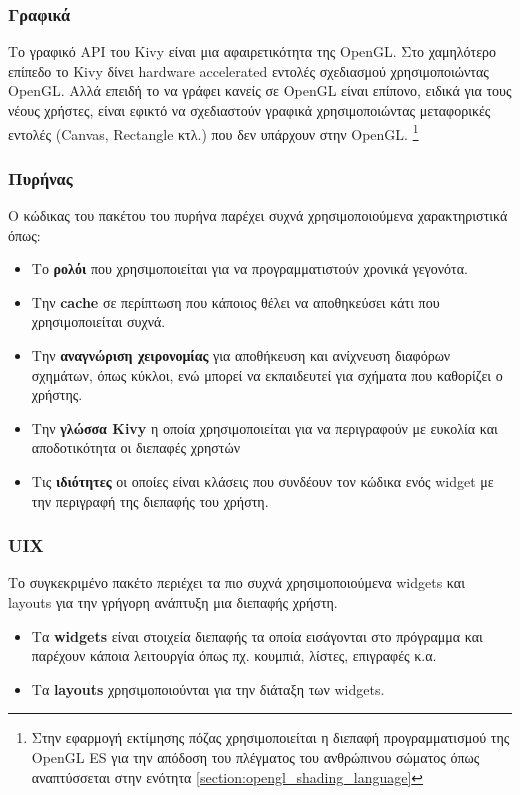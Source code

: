 \subsubsection{Γραφικά}
Το γραφικό API του Kivy είναι μια αφαιρετικότητα της OpenGL. Στο χαμηλότερο επίπεδο το Kivy δίνει hardware accelerated εντολές σχεδιασμού χρησιμοποιώντας OpenGL. Αλλά επειδή το να γράφει κανείς σε OpenGL είναι επίπονο, ειδικά για τους νέους χρήστες, είναι εφικτό να σχεδιαστούν γραφικά χρησιμοποιώντας μεταφορικές εντολές (Canvas, Rectangle κτλ.) που δεν υπάρχουν στην OpenGL. \footnote{Στην εφαρμογή εκτίμησης πόζας χρησιμοποιείται η διεπαφή προγραμματισμού της OpenGL ES για την απόδοση του πλέγματος του ανθρώπινου σώματος όπως αναπτύσσεται στην ενότητα \ref{section:opengl_shading_language}}

\subsubsection{Πυρήνας}
Ο κώδικας του πακέτου του πυρήνα παρέχει συχνά χρησιμοποιούμενα χαρακτηριστικά όπως:
\begin{itemize}
    \item Το \textbf{ρολόι} που χρησιμοποιείται για να προγραμματιστούν χρονικά γεγονότα.
    \item Την \textbf{cache} σε περίπτωση που κάποιος θέλει να αποθηκεύσει κάτι που χρησιμοποιείται συχνά.
    \item Την \textbf{αναγνώριση χειρονομίας} για αποθήκευση και ανίχνευση διαφόρων σχημάτων, όπως κύκλοι, ενώ μπορεί να εκπαιδευτεί για σχήματα που καθορίζει ο χρήστης.
    \item Την \textbf{γλώσσα Kivy} η οποία χρησιμοποιείται για να περιγραφούν με ευκολία και αποδοτικότητα οι διεπαφές χρηστών
    \item Τις \textbf{ιδιότητες} οι οποίες είναι κλάσεις που συνδέουν τον κώδικα ενός widget με την περιγραφή της διεπαφής του χρήστη.
\end{itemize}

\subsubsection{UIX}
Το συγκεκριμένο πακέτο περιέχει τα πιο συχνά χρησιμοποιούμενα widgets και layouts για την γρήγορη ανάπτυξη μια διεπαφής χρήστη.
\begin{itemize}
    \item Τα \textbf{widgets} είναι στοιχεία διεπαφής τα οποία εισάγονται στο πρόγραμμα και παρέχουν κάποια λειτουργία όπως πχ. κουμπιά, λίστες, επιγραφές κ.α.
    \item Τα \textbf{layouts} χρησιμοποιούνται για την διάταξη των widgets.
\end{itemize}